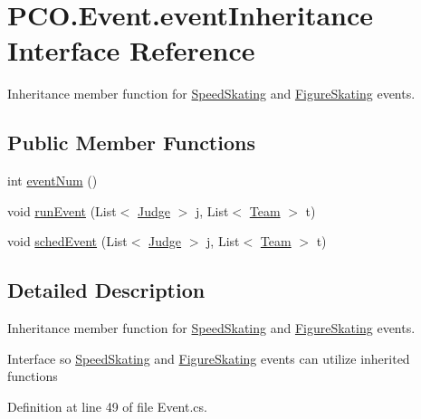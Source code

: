 \hypertarget{interfacePCO_1_1Event_1_1eventInheritance}{\section{P\+C\+O.\+Event.\+event\+Inheritance Interface Reference}
\label{interfacePCO_1_1Event_1_1eventInheritance}
}


Inheritance member function for \hyperlink{classPCO_1_1SpeedSkating}{Speed\+Skating} and \hyperlink{classPCO_1_1FigureSkating}{Figure\+Skating} events.  


\subsection*{Public Member Functions}
\begin{DoxyCompactItemize}
\item 
int \hyperlink{interfacePCO_1_1Event_1_1eventInheritance_a3c61b63b74b3db5a3cddd0b853dfcc26}{event\+Num} ()
\item 
void \hyperlink{interfacePCO_1_1Event_1_1eventInheritance_a0d5523c4803a10534acdf520f40e1e66}{run\+Event} (List$<$ \hyperlink{classPCO_1_1Judge}{Judge} $>$ j, List$<$ \hyperlink{classPCO_1_1Team}{Team} $>$ t)
\item 
void \hyperlink{interfacePCO_1_1Event_1_1eventInheritance_a6250c8bbdabaf5762298255c6a579aa8}{sched\+Event} (List$<$ \hyperlink{classPCO_1_1Judge}{Judge} $>$ j, List$<$ \hyperlink{classPCO_1_1Team}{Team} $>$ t)
\end{DoxyCompactItemize}


\subsection{Detailed Description}
Inheritance member function for \hyperlink{classPCO_1_1SpeedSkating}{Speed\+Skating} and \hyperlink{classPCO_1_1FigureSkating}{Figure\+Skating} events. 

Interface so \hyperlink{classPCO_1_1SpeedSkating}{Speed\+Skating} and \hyperlink{classPCO_1_1FigureSkating}{Figure\+Skating} events can utilize inherited functions 

Definition at line 49 of file Event.\+cs.



